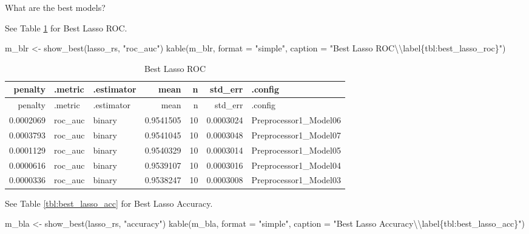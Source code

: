 \documentclass[
]{article}
\newenvironment{Shaded}{}{}
\newcommand{\AttributeTok}[1]{\textcolor[rgb]{0.49,0.56,0.16}{#1}}
\newcommand{\FunctionTok}[1]{\textcolor[rgb]{0.02,0.16,0.49}{#1}}
\newcommand{\NormalTok}[1]{#1}
\newcommand{\OtherTok}[1]{\textcolor[rgb]{0.00,0.44,0.13}{#1}}
\newcommand{\SpecialCharTok}[1]{\textcolor[rgb]{0.25,0.44,0.63}{#1}}
\newcommand{\StringTok}[1]{\textcolor[rgb]{0.25,0.44,0.63}{#1}}
\begin{document}
What are the best models?

See Table \ref{tbl:best_lasso_roc} for Best Lasso ROC.

\begin{Shaded}
\begin{Highlighting}[]
\NormalTok{m\_blr }\OtherTok{\textless{}{-}} \FunctionTok{show\_best}\NormalTok{(lasso\_rs, }\StringTok{"roc\_auc"}\NormalTok{)}
\FunctionTok{kable}\NormalTok{(m\_blr, }\AttributeTok{format =} \StringTok{"simple"}\NormalTok{, }\AttributeTok{caption =} \StringTok{"Best Lasso ROC}\SpecialCharTok{\textbackslash{}\textbackslash{}}\StringTok{label\{tbl:best\_lasso\_roc\}"}\NormalTok{)}
\end{Highlighting}
\end{Shaded}

\begin{longtable}[]{@{}rllrrrl@{}}
\caption{Best Lasso ROC\label{tbl:best_lasso_roc}}\tabularnewline
\toprule
penalty & .metric & .estimator & mean & n & std\_err & .config \\
\midrule
\endfirsthead
\toprule
penalty & .metric & .estimator & mean & n & std\_err & .config \\
\midrule
\endhead
0.0002069 & roc\_auc & binary & 0.9541505 & 10 & 0.0003024 &
Preprocessor1\_Model06 \\
0.0003793 & roc\_auc & binary & 0.9541045 & 10 & 0.0003048 &
Preprocessor1\_Model07 \\
0.0001129 & roc\_auc & binary & 0.9540329 & 10 & 0.0003014 &
Preprocessor1\_Model05 \\
0.0000616 & roc\_auc & binary & 0.9539107 & 10 & 0.0003016 &
Preprocessor1\_Model04 \\
0.0000336 & roc\_auc & binary & 0.9538247 & 10 & 0.0003008 &
Preprocessor1\_Model03 \\
\bottomrule
\end{longtable}

See Table \ref{tbl:best_lasso_acc} for Best Lasso Accuracy.

\begin{Shaded}
\begin{Highlighting}[]
\NormalTok{m\_bla }\OtherTok{\textless{}{-}} \FunctionTok{show\_best}\NormalTok{(lasso\_rs, }\StringTok{"accuracy"}\NormalTok{)}
\FunctionTok{kable}\NormalTok{(m\_bla, }\AttributeTok{format =} \StringTok{"simple"}\NormalTok{, }\AttributeTok{caption =} \StringTok{"Best Lasso Accuracy}\SpecialCharTok{\textbackslash{}\textbackslash{}}\StringTok{label\{tbl:best\_lasso\_acc\}"}\NormalTok{)}
\end{Highlighting}
\end{Shaded}
\end{document}

